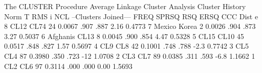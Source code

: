 \documentclass{article}
\begin{document}
\begin{Woutput}
The CLUSTER Procedure
Average Linkage Cluster Analysis
                                     Cluster History
                                                                                Norm    T
                                                                                 RMS    i
   NCL    --Clusters Joined---      FREQ     SPRSQ     RSQ    ERSQ     CCC      Dist    e
     8    CL12        CL74            24    0.0067    .907    .887    2.16    0.4773
     7    Mexico      Korea            2    0.0026    .904    .873    3.27    0.5037
     6    Afghanis    CL13             8    0.0045    .900    .854    4.47    0.5328
     5    CL15        CL10            45    0.0517    .848    .827    1.57    0.5697
     4    CL9         CL8             42    0.1001    .748    .788    -2.3    0.7742
     3    CL5         CL4             87    0.3980    .350    .723     -12    1.0708
     2    CL3         CL7             89    0.0385    .311    .593    -6.8    1.1662
     1    CL2         CL6             97    0.3114    .000    .000    0.00    1.5693


\end{Woutput}
\end{document}
